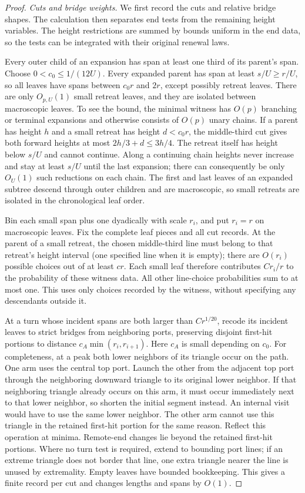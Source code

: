 \begin{proof}
\emph{Cuts and bridge weights.}
We first record the cuts and relative bridge shapes. The calculation
then separates end tests from the remaining height variables. The
height restrictions are summed by bounds uniform in the end data, so
the tests can be integrated with their original renewal laws.

Every outer child of an expansion has span at least one third
of its parent's span. Choose $0<c_0\le1/(12U)$. Every expanded parent
has span at least $s/U\ge r/U$, so all leaves have spans between
$c_0r$ and $2r$, except possibly retreat leaves.
There are only $O_{p,U}(1)$ small retreat leaves, and they are isolated
between macroscopic leaves. To see the bound, the minimal witness has
$O(p)$ branching or terminal expansions and otherwise consists of
$O(p)$ unary chains. If a parent has height $h$ and a small retreat
has height $d<c_0r$, the middle-third cut gives both forward heights
at most $2h/3+d\le3h/4$. The retreat itself has height below $s/U$
and cannot continue.
Along a continuing chain heights never increase and stay at least
$s/U$ until the last expansion; there can consequently be only
$O_U(1)$ such reductions on each chain.
The first and last leaves of an expanded subtree descend through
outer children and are macroscopic, so small retreats are isolated
in the chronological leaf order.

Bin each small span plus one dyadically with scale $r_i$, and put
$r_i=r$ on macroscopic leaves. Fix the complete leaf pieces and all
cut records. At the parent of a small retreat, the chosen middle-third
line must belong to that retreat's height interval (one specified line
when it is empty); there are $O(r_i)$ possible choices out of at least
$cr$. Each small leaf therefore contributes $Cr_i/r$ to the probability
of these witness data. All other line-choice probabilities sum to at
most one. This uses only choices recorded by the witness, without
specifying any descendants outside it.

At a turn whose incident spans are both larger than $Cr^{1/20}$,
recode its incident leaves to strict bridges from neighboring ports,
preserving disjoint first-hit portions to distance
$c_A\min(r_i,r_{i+1})$. Here $c_A$ is small depending on $c_0$.
For completeness, at a peak both lower neighbors of its triangle occur
on the path. One arm uses the central top port. Launch the other from
the adjacent top port through the neighboring downward triangle to
its original lower neighbor. If that neighboring triangle already
occurs on this arm, it must occur immediately next to that lower
neighbor, so shorten the initial segment instead. An internal visit
would have to use the same lower neighbor. The other arm cannot use
this triangle in the retained first-hit portion for the same reason.
Reflect this operation at minima. Remote-end changes lie beyond the
retained first-hit portions. Where no turn test is required, extend
to bounding port lines; if an extreme triangle does not border that
line, one extra triangle nearer the line is unused by extremality.
Empty leaves have bounded bookkeeping. This gives a finite record
per cut and changes lengths and spans by $O(1)$.


\end{proof}
